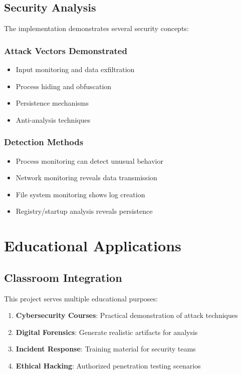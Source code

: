\documentclass[12pt,a4paper]{article}
\begin{document}
\subsection{Security Analysis}

The implementation demonstrates several security concepts:

\subsubsection{Attack Vectors Demonstrated}
\begin{itemize}
    \item Input monitoring and data exfiltration
    \item Process hiding and obfuscation
    \item Persistence mechanisms
    \item Anti-analysis techniques
\end{itemize}

\subsubsection{Detection Methods}
\begin{itemize}
    \item Process monitoring can detect unusual behavior
    \item Network monitoring reveals data transmission
    \item File system monitoring shows log creation
    \item Registry/startup analysis reveals persistence
\end{itemize}

\section{Educational Applications}

\subsection{Classroom Integration}

This project serves multiple educational purposes:

\begin{enumerate}
    \item \textbf{Cybersecurity Courses}: Practical demonstration of attack techniques
    \item \textbf{Digital Forensics}: Generate realistic artifacts for analysis
    \item \textbf{Incident Response}: Training material for security teams
    \item \textbf{Ethical Hacking}: Authorized penetration testing scenarios
\end{enumerate}
\end{document}
